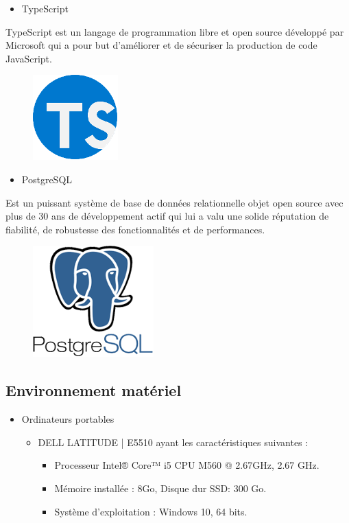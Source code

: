 \begin{itemize}
    \item	TypeScript
\end{itemize}
\par TypeScript est un langage de programmation libre et open source développé par Microsoft qui a pour but d'améliorer et de sécuriser la production de code JavaScript. \cite{10}
\begin{figure}[h]
    \centering
    \includegraphics{figures/33anis13.png}
    \caption*{}
    \label{fig:logo_TYPES}
\end{figure}
\begin{itemize}
    \item	PostgreSQL
\end{itemize}
\par Est un puissant système de base de données relationnelle objet open source avec plus de 30 ans de développement actif qui lui a valu une solide réputation de fiabilité, de robustesse des fonctionnalités et de performances. \cite{11}
\begin{figure}[h]
    \centering
    \includegraphics{figures/33anis14.png}
    \caption*{}
    \label{fig:logo_POSTGRE}
\end{figure}
\subsection{	Environnement matériel}
\begin{itemize}
    \item 	Ordinateurs portables
    \begin{itemize}
        \item DELL LATITUDE | E5510 ayant les caractéristiques suivantes :
        \begin{itemize}
            \item	Processeur Intel® Core™ i5 CPU M560 @ 2.67GHz, 2.67 GHz.
            \item 	Mémoire installée : 8Go, Disque dur SSD: 300 Go.
            \item	Système d’exploitation : Windows 10, 64 bits.
        \end{itemize}
    \end{itemize}
\end{itemize}\newpage
